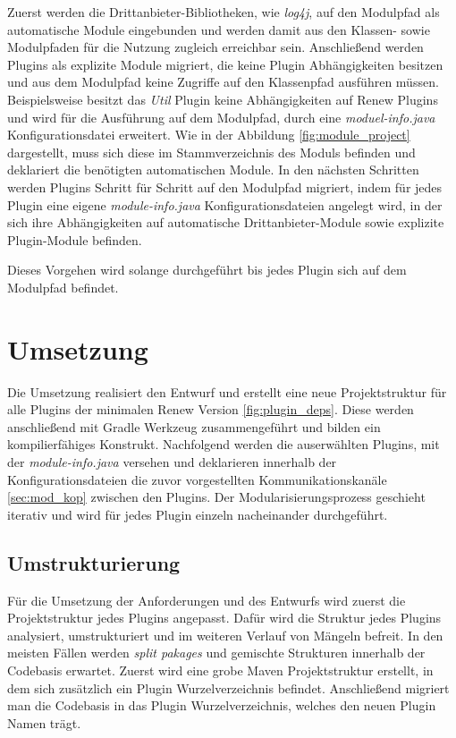 	Zuerst werden die Drittanbieter-Bibliotheken, wie \textit{log4j}, auf den Modulpfad als automatische Module eingebunden und werden damit aus den Klassen- sowie Modulpfaden für die Nutzung zugleich erreichbar sein. Anschließend werden Plugins als explizite Module migriert, die keine Plugin Abhängigkeiten besitzen und aus dem Modulpfad keine Zugriffe auf den Klassenpfad ausführen müssen.   Beispielsweise besitzt das \textit{Util} Plugin keine Abhängigkeiten auf Renew Plugins und wird für die Ausführung auf dem Modulpfad, durch eine \textit{moduel-info.java} Konfigurationsdatei erweitert. Wie in der Abbildung \ref{fig:module_project} dargestellt, muss sich diese im Stammverzeichnis des Moduls befinden und deklariert die benötigten automatischen Module.\newline
	In den nächsten Schritten werden Plugins Schritt für Schritt auf den Modulpfad migriert, indem für jedes Plugin eine eigene \textit{module-info.java} Konfigurationsdateien angelegt wird, in der sich ihre Abhängigkeiten auf automatische Drittanbieter-Module sowie explizite Plugin-Module befinden.\bigbreak 

	Dieses Vorgehen wird solange durchgeführt bis jedes Plugin sich auf dem Modulpfad befindet. 

\section{Umsetzung}
	Die Umsetzung realisiert den Entwurf und erstellt eine neue Projektstruktur für alle Plugins der minimalen Renew Version \ref{fig:plugin_deps}. Diese werden anschließend mit Gradle Werkzeug zusammengeführt und bilden ein kompilierfähiges Konstrukt. Nachfolgend werden die auserwählten Plugins, mit der \textit{module-info.java} versehen und deklarieren innerhalb der Konfigurationsdateien die zuvor vorgestellten Kommunikationskanäle \ref{sec:mod_kop} zwischen den Plugins.\newline
	Der Modularisierungsprozess geschieht iterativ und wird für jedes Plugin einzeln nacheinander durchgeführt.

\subsection{Umstrukturierung}

	Für die Umsetzung der Anforderungen und des Entwurfs wird zuerst die Projektstruktur jedes Plugins angepasst. Dafür wird die Struktur jedes Plugins analysiert, umstrukturiert und im weiteren Verlauf von Mängeln befreit. In den meisten Fällen werden \textit{split pakages} und gemischte Strukturen innerhalb der Codebasis erwartet.\bigbreak
	Zuerst wird eine grobe Maven Projektstruktur erstellt, in dem sich zusätzlich ein Plugin Wurzelverzeichnis befindet. Anschließend migriert man die Codebasis in das Plugin Wurzelverzeichnis, welches den neuen Plugin Namen trägt.

